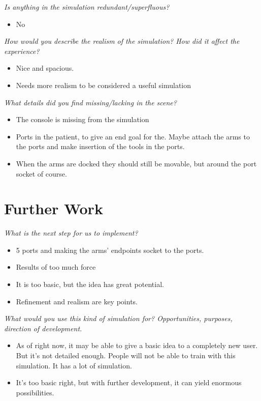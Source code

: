 \textit{Is anything in the simulation redundant/superfluous?}
\begin{itemize}
	\item No
\end{itemize}

\textit{How would you describe the realism of the simulation? How did it affect the experience?}
\begin{itemize}
	\item Nice and spacious.
	\item Needs more realism to be considered a useful simulation
\end{itemize}

\textit{What details did you find missing/lacking in the scene?}
\begin{itemize}
	\item The console is missing from the simulation
	\item Ports in the patient, to give an end goal for the. Maybe attach the arms to the ports and make insertion of the tools in the ports.
	\item When the arms are docked they should still be movable, but around the port socket of course.
\end{itemize}

\section{Further Work}
\textit{What is the next step for us to implement?}
\begin{itemize}
	\item 5 ports and making the arms’ endpoints socket to the ports. 
	\item Results of too much force
	\item It is too basic, but the idea has great potential.
	\item Refinement and realism are key points.
\end{itemize}

\textit{What would you use this kind of simulation for? Opportunities, purposes, direction of development.}
\begin{itemize}
	\item As of right now, it may be able to give a basic idea to a completely new user. But it’s not detailed enough. People will not be able to train with this simulation. It has a lot of simulation.
	\item It’s too basic right, but with further development, it can yield enormous possibilities. 
\end{itemize}

